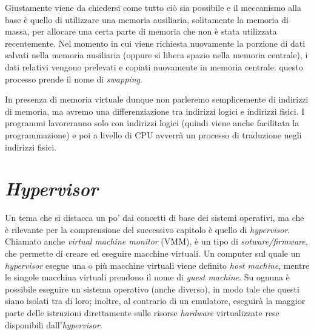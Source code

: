 Giustamente viene da chiedersi come tutto ciò sia possibile e il meccanismo alla base è quello di utilizzare una memoria ausiliaria, solitamente la memoria di massa, per allocare una certa parte di memoria che non è stata utilizzata recentemente. Nel momento in cui viene richiesta nuovamente la porzione di dati salvati nella memoria ausiliaria (oppure si libera spazio nella memoria centrale), i dati relativi vengono prelevati e copiati nuovamente in memoria centrale: questo processo prende il nome di \textit{swapping}. 

In presenza di memoria virtuale dunque non parleremo semplicemente di indirizzi di memoria, ma avremo una differenziazione tra indirizzi logici e indirizzi fisici. I programmi lavoreranno solo con indirizzi logici (quindi viene anche facilitata la programmazione) e poi a livello di CPU avverrà un processo di traduzione negli indirizzi fisici.

\section{\textit{Hypervisor}}
Un tema che si distacca un po' dai concetti di base dei sistemi operativi, ma che è rilevante per la comprensione del successivo capitolo è quello di \textit{hypervisor}. Chiamato anche \textit{virtual machine monitor} (VMM), è un tipo di \textit{sotware/firmware}, che permette di creare ed eseguire macchine virtuali. Un computer sul quale un \textit{hypervisor} esegue una o più macchine virtuali viene definito \textit{host machine}, mentre le singole macchina virtuali prendono il nome di \textit{guest machine}. Su ognuna è possibile eseguire un sistema operativo (anche diverso), in modo tale che questi siano isolati tra di loro; inoltre, al contrario di un emulatore, eseguirà la maggior parte delle istruzioni direttamente sulle risorse \textit{hardware} virtualizzate rese disponibili dall'\textit{hypervisor}.